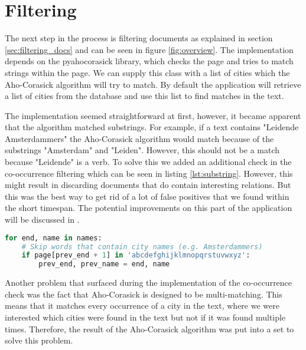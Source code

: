 \section{Filtering}\label{sec:5-filtering}
The next step in the process is filtering documents as explained in section \ref{sec:filtering_docs} and can be seen in figure \ref{fig:overview}. The implementation depends on the pyahocorasick library, which checks the page and tries to match strings within the page. We can supply this class with a list of cities which the Aho-Corasick algorithm will try to match. By default the application will retrieve a list of cities from the database and use this list to find matches in the text.

The implementation seemed straightforward at first, however, it became apparent that the algorithm matched substrings. For example, if a text contains "Leidende Amsterdammers" the Aho-Corasick algorithm would match because of the substrings "Amsterdam" and "Leiden". However, this should not be a match because "Leidende" is a verb. To solve this we added an additional check in the co-occurrence filtering which can be seen in listing \ref{lst:substring}. However, this might result in discarding documents that do contain interesting relations. But this was the best way to get rid of a lot of false positives that we found within the short timespan. The  potential improvements on this part of the application will be discussed in .

\begin{lstlisting}[language=Python, caption=Additional check to prevent substring matches, label={lst:substring}]
for end, name in names:
    # Skip words that contain city names (e.g. Amsterdammers)
    if page[prev_end + 1] in 'abcdefghijklmnopqrstuvwxyz':
        prev_end, prev_name = end, name
\end{lstlisting}

Another problem that surfaced during the implementation of the co-occurrence check was the fact that Aho-Corasick is designed to be multi-matching. This means that it matches every occurrence of a city in the text, where we were interested which cities were found in the text but not if it was found multiple times. Therefore, the result of the Aho-Corasick algorithm was put into a set to solve this problem.
